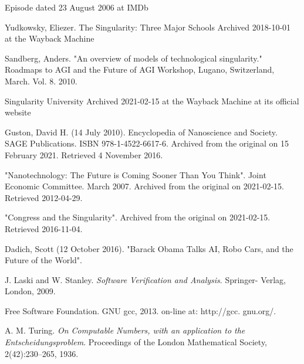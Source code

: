 \documentclass[a4paper]{article}
\begin{document}
\begin{thebibliography}{9}
 Episode dated 23 August 2006 at IMDb

Yudkowsky, Eliezer. The Singularity: Three Major Schools Archived 2018-10-01 at the Wayback Machine

Sandberg, Anders. "An overview of models of technological singularity." Roadmaps to AGI and the Future of AGI Workshop, Lugano, Switzerland, March. Vol. 8. 2010.

 Singularity University Archived 2021-02-15 at the Wayback Machine at its official website

 Guston, David H. (14 July 2010). Encyclopedia of Nanoscience and Society. SAGE Publications. ISBN 978-1-4522-6617-6. Archived from the original on 15 February 2021. Retrieved 4 November 2016.

"Nanotechnology: The Future is Coming Sooner Than You Think". Joint Economic Committee. March 2007. Archived from the original on 2021-02-15. Retrieved 2012-04-29.

 "Congress and the Singularity". Archived from the original on 2021-02-15. Retrieved 2016-11-04.

Dadich, Scott (12 October 2016). "Barack Obama Talks AI, Robo Cars, and the Future of the World".

 J. Laski and W. Stanley. \emph{Software Verification and Analysis}. Springer- Verlag, London, 2009.

 Free Software Foundation. GNU gcc, 2013. on-line at: http://gcc. gnu.org/.

 A. M. Turing. \emph{On Computable Numbers, with an application to the Entscheidungsproblem}. Proceedings of the London Mathematical Society, 2(42):230–265, 1936.

\end{thebibliography}
\end{document}
